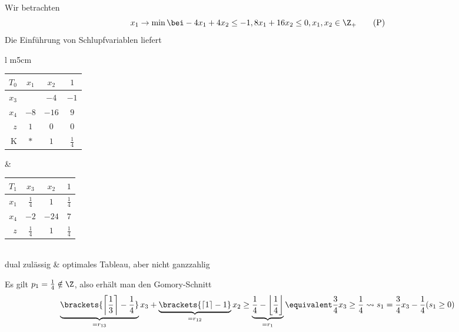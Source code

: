 \begin{beispiel}
	\label{beispiel: 4.6}
	Wir betrachten
	\begin{equation*}
		x_1 \to \min \bei -4x_1 + 4x_2 \le -1 , 8x_1 + 16x_2 \le 0, x_1, x_2 \in \Z_+ 
		\tag{P} \label{eq: 4.6-p}
	\end{equation*}
	Die Einführung von Schlupfvariablen liefert
	
	\begin{tabular}{l m{5cm}}
		\begin{tabular}{r|cc|c}
			$T_0$ & $x_1$ & $x_2$ & $1$ \\ \hline
			$x_3$ & \fbox{$4$} & $-4$ & $-1$ \\
			$x_4$ & $-8$ & $-16$ & $9$ \\ \hline
			$z$ & $1$ & $0$ & $0$ \\ \hline
			K & $\ast$ & $1$ & $\frac{1}{4}$
		\end{tabular}
		&
		\begin{tabular}{r|cc|c}
			$T_1$ & $x_3$ & $x_2$ & $1$ \\ \hline
			$x_1$ & $\frac{1}{4}$ & $1$ & $\frac{1}{4}$ \\
			$x_4$ & $-2$ & $-24$ & $7$ \\ \hline
			$z$ & $\frac{1}{4}$ & $1$ & $\frac{1}{4}$ \\
		\end{tabular} 
		\\
		dual zulässig
		&
		optimales Tableau, aber nicht ganzzahlig	
	\end{tabular}

	Es gilt $p_1 = \frac{1}{4} \notin \Z$, also erhält man den Gomory-Schnitt
	\begin{equation*}
			\underbrace{\brackets{\left\lceil \frac{1}{3} \right\rceil - \frac{1}{4}}}_{=r_{13}} x_3 + \underbrace{\brackets{\left\lceil 1 \right\rceil - 1}}_{= r_{12}} x_2 \ge \underbrace{\frac{1}{4} - \left\lfloor \frac{1}{4} \right\rfloor}_{=r_1}
			\equivalent \frac{3}{4} x_3 \ge \frac{1}{4} \leadsto s_1 = \frac{3}{4} x_3 - \frac{1}{4} (s_1 \ge 0)
	\end{equation*}
	

\end{beispiel}
